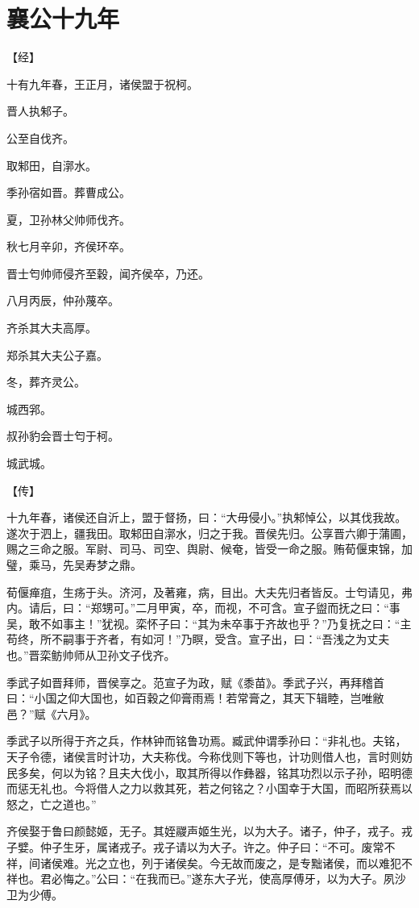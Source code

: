 \documentclass[a4paper,12pt,UTF8,twoside]{ctexbook}
\begin{document}
\section{襄公十九年}



【经】

十有九年春，王正月，诸侯盟于祝柯。

晋人执邾子。

公至自伐齐。

取邾田，自漷水。

季孙宿如晋。葬曹成公。

夏，卫孙林父帅师伐齐。

秋七月辛卯，齐侯环卒。

晋士匄帅师侵齐至穀，闻齐侯卒，乃还。

八月丙辰，仲孙蔑卒。

齐杀其大夫高厚。

郑杀其大夫公子嘉。

冬，葬齐灵公。

城西郛。

叔孙豹会晋士匄于柯。

城武城。

【传】

十九年春，诸侯还自沂上，盟于督扬，曰：“大毋侵小。”执邾悼公，以其伐我故。遂次于泗上，疆我田。取邾田自漷水，归之于我。晋侯先归。公享晋六卿于蒲圃，赐之三命之服。军尉、司马、司空、舆尉、候奄，皆受一命之服。贿荀偃束锦，加璧，乘马，先吴寿梦之鼎。

荀偃瘅疽，生疡于头。济河，及著雍，病，目出。大夫先归者皆反。士匄请见，弗内。请后，曰：“郑甥可。”二月甲寅，卒，而视，不可含。宣子盥而抚之曰：“事吴，敢不如事主！”犹视。栾怀子曰：“其为未卒事于齐故也乎？”乃复抚之曰：“主苟终，所不嗣事于齐者，有如河！”乃瞑，受含。宣子出，曰：“吾浅之为丈夫也。”晋栾鲂帅师从卫孙文子伐齐。

季武子如晋拜师，晋侯享之。范宣子为政，赋《黍苗》。季武子兴，再拜稽首曰：“小国之仰大国也，如百穀之仰膏雨焉！若常膏之，其天下辑睦，岂唯敝邑？”赋《六月》。

季武子以所得于齐之兵，作林钟而铭鲁功焉。臧武仲谓季孙曰：“非礼也。夫铭，天子令德，诸侯言时计功，大夫称伐。今称伐则下等也，计功则借人也，言时则妨民多矣，何以为铭？且夫大伐小，取其所得以作彝器，铭其功烈以示子孙，昭明德而惩无礼也。今将借人之力以救其死，若之何铭之？小国幸于大国，而昭所获焉以怒之，亡之道也。”

齐侯娶于鲁曰颜懿姬，无子。其姪鬷声姬生光，以为大子。诸子，仲子，戎子。戎子嬖。仲子生牙，属诸戎子。戎子请以为大子。许之。仲子曰：“不可。废常不祥，间诸侯难。光之立也，列于诸侯矣。今无故而废之，是专黜诸侯，而以难犯不祥也。君必悔之。”公曰：“在我而已。”遂东大子光，使高厚傅牙，以为大子。夙沙卫为少傅。
\end{document}
